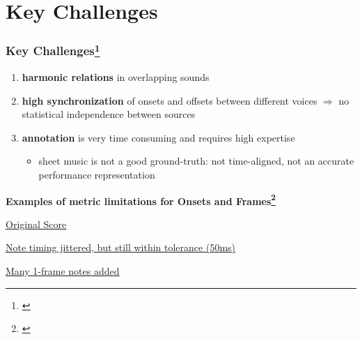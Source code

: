\documentclass{beamer}
\newcommand{\emp}[1]{\textcolor{tum}{\textbf{#1}}}
\begin{document}
\section{Key Challenges}
\begin{frame}
	\frametitle{Key Challenges\footnote{\cite{Overview}}}
	\begin{enumerate}
		\item \textbf{harmonic relations} in overlapping sounds
		\item \textbf{high synchronization} of onsets and offsets between different voices $\Rightarrow$ no statistical independence between sources
		\item \textbf{annotation} is very time consuming and requires high expertise
		      \begin{itemize}
			      \item sheet music is not a good ground-truth: not time-aligned, not an accurate performance representation
		      \end{itemize}
	\end{enumerate}

	\vspace{5mm}

	\emp{Examples of metric limitations for Onsets and Frames\footnote{\cite{OF}}}

	\vspace{1mm}

	\href{https://storage.googleapis.com/magentadata/papers/onsets-frames/fur_elise_framescore_good2.mp3}{\underline{Original Score}}

	\vspace{2mm}

	\href{https://storage.googleapis.com/magentadata/papers/onsets-frames/fur_elise_notejitter_score1.mp3}{\underline{Note timing jittered, but still within tolerance (50ms)}}

	\vspace{2mm}

	\href{https://storage.googleapis.com/magentadata/papers/onsets-frames/fur_elise_framescore_bad3.mp3}{\underline{Many 1-frame notes added}}

\end{frame}
\end{document}
